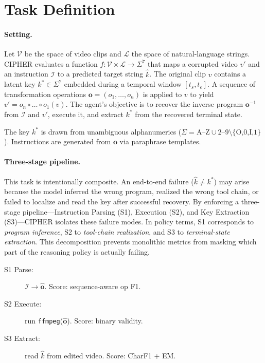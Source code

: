 \section{Task Definition}
\label{sec:task}

\paragraph{Setting.}
Let $\mathcal{V}$ be the space of video clips and $\mathcal{L}$ the space of
natural-language strings. CIPHER evaluates a function
$f: \mathcal{V} \times \mathcal{L} \to \Sigma^7$ that maps a corrupted video
$v'$ and an instruction $\mathcal{I}$ to a predicted target string $\hat{k}$.
The original clip $v$ contains a latent key $k^* \in \Sigma^7$ embedded during
a temporal window $[t_s, t_e]$. A sequence of transformation operations
$\mathbf{o} = (o_1, \dots, o_n)$ is applied to $v$ to yield
$v' = o_n \circ \dots \circ o_1 (v)$. The agent's objective is to recover the
inverse program $\mathbf{o}^{-1}$ from $\mathcal{I}$ and $v'$, execute it, and
extract $k^*$ from the recovered terminal state.

The key $k^*$ is drawn from unambiguous alphanumerics
($\Sigma = \text{A--Z} \cup \text{2--9} \setminus \{\text{O,0,I,1}\}$).
Instructions are generated from $\mathbf{o}$ via paraphrase templates.

\paragraph{Three-stage pipeline.}
This task is intentionally composite. An end-to-end failure
($\hat{k} \neq k^*$) may arise because the model inferred the wrong program,
realized the wrong tool chain, or failed to localize and read the key after
successful recovery. By enforcing a three-stage pipeline---Instruction Parsing
(S1), Execution (S2), and Key Extraction (S3)---CIPHER isolates these failure
modes. In policy terms, S1 corresponds to \emph{program inference}, S2 to
\emph{tool-chain realization}, and S3 to \emph{terminal-state extraction}.
This decomposition prevents monolithic metrics from masking which part of the
reasoning policy is actually failing.

\begin{description}
  \item[S1 Parse:] $\mathcal{I} \to \hat{\mathbf{o}}$. Score: sequence-aware op F1.
  \item[S2 Execute:] run \texttt{ffmpeg}($\hat{\mathbf{o}}$). Score: binary validity.
  \item[S3 Extract:] read $\hat{k}$ from edited video. Score: CharF1 + EM.
\end{description}

